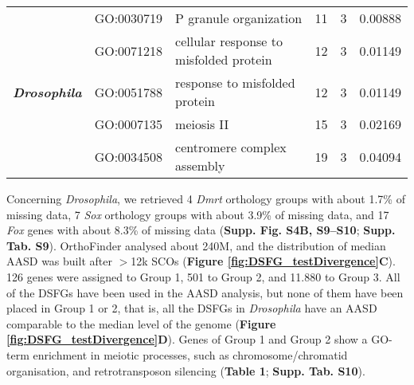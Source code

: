 \documentclass[../main.tex]{subfiles}
\begin{document}
\begin{landscape}
\begin{longtable}{@{}lllccr@{}}
     \multirow{5}{*}{\textit{\textbf{Drosophila}}} & GO:0030719 & P granule organization & 11 & 3 & 0.00888 \\
     & GO:0071218 & cellular response to misfolded protein & 12 & 3 & 0.01149 \\
     & GO:0051788 & response to misfolded protein & 12 & 3 & 0.01149 \\
     & GO:0007135 & meiosis II & 15 & 3 & 0.02169 \\
     & GO:0034508 & centromere complex assembly & 19 & 3 & 0.04094 \\* \bottomrule \bottomrule
    \end{longtable}
    \end{landscape}

Concerning \textit{Drosophila}, we retrieved 4 \textit{Dmrt} orthology groups with about 1.7\% of missing data, 7 \textit{Sox} orthology groups with about 3.9\% of missing data, and 17 \textit{Fox} genes with about 8.3\% of missing data (\textbf{Supp. Fig. S4B, S9--S10}; \textbf{Supp. Tab. S9}). OrthoFinder analysed about 240M, and the distribution of median AASD was built after $>$12k SCOs (\textbf{Figure \ref{fig:DSFG_testDivergence}C}). 126 genes were assigned to Group 1, 501 to Group 2, and 11.880 to Group 3. All of the DSFGs have been used in the AASD analysis, but none of them have been placed in Group 1 or 2, that is, all the DSFGs in \textit{Drosophila} have an AASD comparable to the median level of the genome (\textbf{Figure \ref{fig:DSFG_testDivergence}D}). Genes of Group 1 and Group 2 show a GO-term enrichment in meiotic processes, such as chromosome/chromatid organisation, and retrotransposon silencing (\textbf{Table 1}; \textbf{Supp. Tab. S10}).
\end{document}
